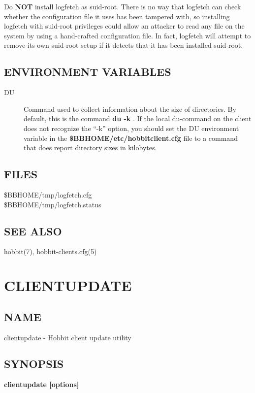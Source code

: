   Do \textbf{NOT}
 install logfetch as suid-root. There is no way that logfetch can check whether the configuration file it uses has been tampered with, so installing logfetch with suid-root privileges could allow an attacker to read any file on the system by using a hand-crafted configuration file. In fact, logfetch will attempt to remove its own suid-root setup if it detects that it has been installed suid-root. 


 
\subsection{ENVIRONMENT VARIABLES}
\begin{description}
\item[DU] Command used to collect information about the size of directories. By default, this is the command \textbf{du -k}
. If the local du-command on the client does not recognize the ``-k'' option, you should set the DU environment variable in the \textbf{\$BBHOME/etc/hobbitclient.cfg}
 file to a command that does report directory sizes in kilobytes. 

 


\end{description}
\subsection{FILES}
\begin{description}
\item[\$BBHOME/tmp/logfetch.cfg]
\item[\$BBHOME/tmp/logfetch.status]

 


\end{description}
\subsection{SEE ALSO}
hobbit(7), hobbit-clients.cfg(5) 

%
\newpage
\section{CLIENTUPDATE}


\subsection{NAME}
 clientupdate - Hobbit client update utility \subsection{SYNOPSIS}
\textbf{clientupdate [options]}


